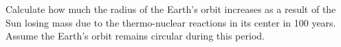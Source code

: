 Calculate how much the radius of the Earth's orbit increases as a result of the
Sun losing mass due to the thermo-nuclear reactions in its center in 100 years.
Assume the Earth's orbit remains circular during this period.

